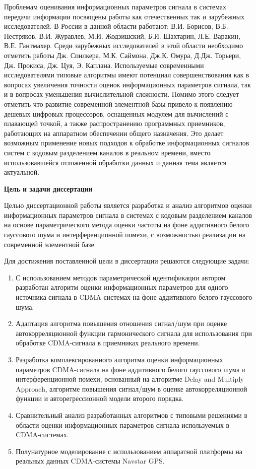 Проблемам оценивания информационных параметров сигнала в системах передачи информации посвящены работы как отечественных так и зарубежных исследователей.
В России в данной области работают: В.И. Борисов, В.Б. Пестряков, В.И. Журавлев, М.И. Жодзишский,
Б.И. Шахтарин, Л.Е. Варакин, В.Е. Гантмахер.
Среди зарубежных исследователей в этой области необходимо отметить работы Дж. Спилкера, М.К. Саймона, Дж.К. Омура, Д.Дж. Торьери, Дж. Прокиса, Дж. Цуя, Э. Каплана.
Используемые современными исследователями типовые алгоритмы имеют потенциал совершенствования как в вопросах увеличения точности оценок
информационных параметров сигнала, так и в вопросах уменьшения вычислительной сложности.
Помимо этого следует отметить что развитие современной элементной базы привело к появлению дешевых цифровых процессоров, оснащенных модулем для вычислений
с плавающей точкой, а также распространению программных приемников, работающих на аппаратном обеспечении общего назначения. Это делает возможным применение новых
подходов к обработке информационных сигналов систем с кодовым разделением каналов в реальном времени, вместо использовавшейся отложенной обработки данных и данная
тема является актуальной.

{\bf{Цель и задачи диссертации}}

Целью диссертационной работы является разработка и анализ алгоритмов оценки информационных параметров сигнала в системах с кодовым разделением каналов на основе
параметрического метода оценки частоты на фоне аддитивного белого гауссового шума и интерференционной помехи,
с возможностью реализации на современной элементной базе.

Для достижения поставленной цели в диссертации решаются следующие задачи:
\begin{enumerate}
	\item {С использованием методов параметрической идентификации автором разработан алгоритм оценки информационных параметров для одного источника сигнала
		в CDMA-системах на фоне аддитивного белого гауссового шума.}
	\item {Адаптация алгоритма повышения отношения сигнал/шум при оценке автокорреляционной функции гармонического сигнала для использования при обработке
		CDMA-сигнала в приемниках реального времени.}
	\item {Разработка комплексированного алгоритма оценки информационных параметров CDMA-сигнала на фоне аддитивного белого гауссового шума и
		интерференционной помехи, основанный на алгоритме Delay and Multiply Approach, алгоритме повышения сигнал/шум в оценке автокорреляционной функции 
		и авторегрессионной модели второго порядка.}
	\item {Сравнительный анализ разработанных алгоритмов с типовыми решениями в области оценки информационных параметров сигнала используемых в CDMA-системах.}
	\item {Полунатурное моделирование с использованием аппаратной платформы на реальных данных CDMA-системы Navstar GPS.}
\end{enumerate}

